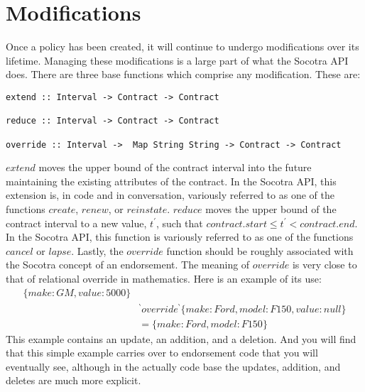 \section{Modifications}
\label{sec:01:4}
Once a policy has been created, it will continue to undergo modifications over its lifetime. Managing these modifications
is a large part of what the Socotra API does. There are three base functions which comprise any modification. These are:
\begin{lstlisting}
extend :: Interval -> Contract -> Contract

reduce :: Interval -> Contract -> Contract

override :: Interval ->  Map String String -> Contract -> Contract
\end{lstlisting}
$extend$ moves the upper bound of the contract interval into the future maintaining the existing attributes of the contract. In
the Socotra API, this extension is, in code and in conversation, variously referred to as one of the functions $create$, $renew$, or
$reinstate$. $reduce$ moves the upper bound of the contract interval to a new value, $t^\prime$, such that $contract.start \leq t^\prime < contract.end$.
In the Socotra API, this function is variously referred to as one of the functions $cancel$ or $lapse$. Lastly, the $override$
function should be roughly associated with the Socotra concept of an endorsement. The meaning of $override$ is very close to
that of relational override in mathematics. Here is an example of its use:
\begin{eqnarray*}
\{make: GM, value: 5000\} & \\
& { ^\backprime}overrid{e^\backprime} \{make: Ford, model: F150, value: null\} \\
& = \{make: Ford, model: F150\}
\end{eqnarray*}
This example contains an update, an addition, and a deletion. And you will find that this simple example carries
over to endorsement code that you will eventually see, although in the actually code base the updates,
addition, and deletes are much more explicit.

